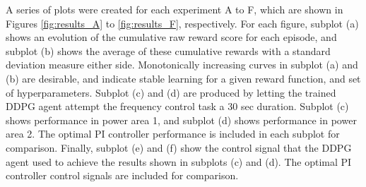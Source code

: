 A series of plots were created for each experiment A to F, which are shown in Figures \ref{fig:results_A} to \ref{fig:results_F}, respectively. For each figure, subplot (a) shows an evolution of the cumulative raw reward score for each episode, and subplot (b) shows the average of these cumulative rewards with a standard deviation measure either side. Monotonically increasing curves in subplot (a) and (b) are desirable, and indicate stable learning for a given reward function, and set of hyperparameters. Subplot (c) and (d) are produced by letting the trained DDPG agent attempt the frequency control task a 30 sec duration. Subplot (c) shows performance in power area 1, and subplot (d) shows performance in power area 2. The optimal PI controller performance is included in each subplot for comparison. Finally, subplot (e) and (f) show the control signal that the DDPG agent used to achieve the results shown in subplots (c) and (d). The optimal PI controller control signals are included for comparison.